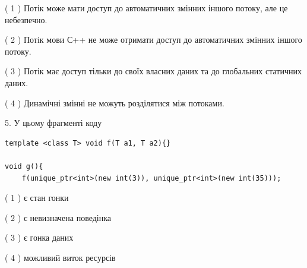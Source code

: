 \documentclass[12pt, ukrainian]{article}
\begin{document}
\begin {large}
{( 1 ) Потік може мати доступ до автоматичних змінних іншого потоку, але це небезпечно.%

( 2 ) Потік мови С++ не може отримати доступ до автоматичних змінних іншого потоку.%

( 3 ) Потік має доступ тільки до своїх власних даних та до глобальних статичних даних.%

( 4 ) Динамічні змінні не можуть розділятися між потоками.%


5. У цьому фрагменті коду
\begin{verbatim}
template <class T> void f(T a1, T a2){}

void g(){
    f(unique_ptr<int>(new int(3)), unique_ptr<int>(new int(35)));
\end{verbatim}

( 1 ) є стан гонки%

( 2 ) є невизначена поведінка%

( 3 ) є гонка даних%

( 4 ) можливий виток ресурсів%
}
\end {large}
\end{document}
